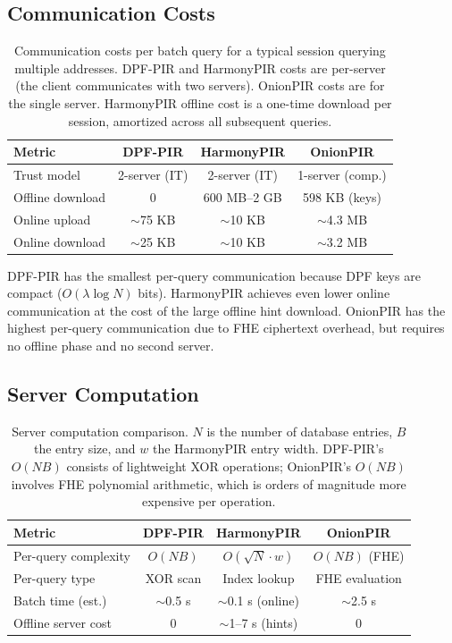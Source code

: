 \subsection{Communication Costs}

\begin{table}[htbp]
\centering
\begin{tabular}{|l|c|c|c|}
\hline
\textbf{Metric} & \textbf{DPF-PIR} & \textbf{HarmonyPIR} & \textbf{OnionPIR} \\
\hline
Trust model & 2-server (IT) & 2-server (IT) & 1-server (comp.) \\
Offline download & 0 & 600 MB--2 GB & 598 KB (keys) \\
Online upload & $\sim$75 KB & $\sim$10 KB & $\sim$4.3 MB \\
Online download & $\sim$25 KB & $\sim$10 KB & $\sim$3.2 MB \\
\hline
\end{tabular}
\caption{Communication costs per batch query for a typical session querying multiple addresses. DPF-PIR and HarmonyPIR costs are per-server (the client communicates with two servers). OnionPIR costs are for the single server. HarmonyPIR offline cost is a one-time download per session, amortized across all subsequent queries.}
\label{tab:comparison-comm}
\end{table}

DPF-PIR has the smallest per-query communication because DPF keys are compact ($O(\lambda \log N)$ bits). HarmonyPIR achieves even lower online communication at the cost of the large offline hint download. OnionPIR has the highest per-query communication due to FHE ciphertext overhead, but requires no offline phase and no second server.

\subsection{Server Computation}

\begin{table}[htbp]
\centering
\begin{tabular}{|l|c|c|c|}
\hline
\textbf{Metric} & \textbf{DPF-PIR} & \textbf{HarmonyPIR} & \textbf{OnionPIR} \\
\hline
Per-query complexity & $O(NB)$ & $O(\sqrt{N} \cdot w)$ & $O(NB)$ (FHE) \\
Per-query type & XOR scan & Index lookup & FHE evaluation \\
Batch time (est.) & $\sim$0.5 s & $\sim$0.1 s (online) & $\sim$2.5 s \\
Offline server cost & 0 & $\sim$1--7 s (hints) & 0 \\
\hline
\end{tabular}
\caption{Server computation comparison. $N$ is the number of database entries, $B$ the entry size, and $w$ the HarmonyPIR entry width. DPF-PIR's $O(NB)$ consists of lightweight XOR operations; OnionPIR's $O(NB)$ involves FHE polynomial arithmetic, which is orders of magnitude more expensive per operation.}
\label{tab:comparison-compute}
\end{table}

